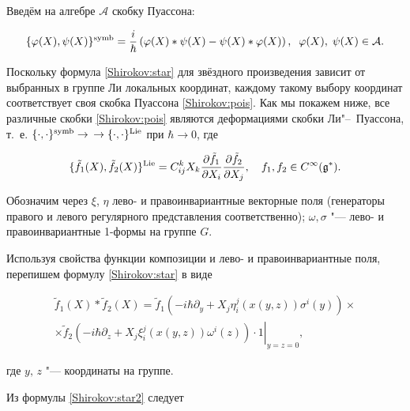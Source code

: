 Введём на алгебре $\mathcal{A}$ скобку Пуассона:

\begin{equation}\label{Shirokov:pois}  

\{\varphi(X),\psi(X)\}^{\rm symb}=\frac{i}{\hbar}\left(\varphi(X)*\psi(X)-\psi(X)*\varphi(X)\right),\; \; \varphi(X),\; \psi(X)\in \mathcal{A}.

\end{equation}

Поскольку формула \eqref{Shirokov:star} для звёздного произведения зависит от выбранных в группе Ли локальных координат, каждому такому выбору координат соответствует своя скобка Пуассона \eqref{Shirokov:pois}. Как мы покажем ниже, все различные скобки \eqref{Shirokov:pois} являются деформациями скобки Ли"--~Пуассона, т.~е. $\{\cdot,\cdot\}^{\rm symb}\to$ \linebreak $\to \{\cdot,\cdot\}^{\rm Lie}$ при $\hbar\to 0$, где

\begin{equation}

\label{Shirokov:2}

\lbrace{\tilde f}_1(X),{\tilde f}_2(X)\rbrace ^{\rm Lie}=C_{ij}^kX_k\frac{\partial {\tilde f}_1}{\partial X_i}\frac{\partial {\tilde f}_2}{\partial X_j},\quad f_1,f_2\in C^\infty(\mathfrak{g}^\ast).

\end{equation}

Обозначим через $\xi$, $\eta$  лево- и правоинвариантные векторные поля (генераторы правого и левого регулярного представления соответственно); $\omega,\sigma$ "--- лево- и правоинвариантные 1-формы на группе $G$. 



Используя свойства функции композиции и лево- и правоинвариантные поля, перепишем формулу \eqref{Shirokov:star} в виде

\begin{multline}\label{Shirokov:star2}

{\tilde f}_1(X)*{\tilde f}_2(X)={\tilde f}_1\left(-i\hbar\partial_y+X_j\eta_i^j(x(y,z))\sigma^i(y)\right)\times \\  \times\left.{\tilde f}_2\left(-i\hbar\partial_z+X_j\xi_i^j(x(y,z))\omega^i(z)\right)\cdot 1\right|_{y=z=0},

\end{multline}

где $y,\,z$ "--- координаты на группе.

Из формулы \eqref{Shirokov:star2} следует

